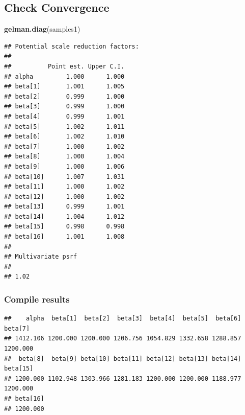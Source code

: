\documentclass[
]{article}
\newenvironment{Shaded}{\begin{snugshade}}{\end{snugshade}}
\newcommand{\FunctionTok}[1]{\textcolor[rgb]{0.13,0.29,0.53}{\textbf{#1}}}
\newcommand{\NormalTok}[1]{#1}
\newcommand{\OtherTok}[1]{\textcolor[rgb]{0.56,0.35,0.01}{#1}}
\newcommand{\SpecialCharTok}[1]{\textcolor[rgb]{0.81,0.36,0.00}{\textbf{#1}}}
\begin{document}
\subsection{Check Convergence}\label{check-convergence}

\begin{Shaded}
\begin{Highlighting}[]
\FunctionTok{gelman.diag}\NormalTok{(samples1)}
\end{Highlighting}
\end{Shaded}

\begin{verbatim}
## Potential scale reduction factors:
## 
##          Point est. Upper C.I.
## alpha         1.000      1.000
## beta[1]       1.001      1.005
## beta[2]       0.999      1.000
## beta[3]       0.999      1.000
## beta[4]       0.999      1.001
## beta[5]       1.002      1.011
## beta[6]       1.002      1.010
## beta[7]       1.000      1.002
## beta[8]       1.000      1.004
## beta[9]       1.000      1.006
## beta[10]      1.007      1.031
## beta[11]      1.000      1.002
## beta[12]      1.000      1.002
## beta[13]      0.999      1.001
## beta[14]      1.004      1.012
## beta[15]      0.998      0.998
## beta[16]      1.001      1.008
## 
## Multivariate psrf
## 
## 1.02
\end{verbatim}

\subsubsection{Compile results}\label{compile-results}

\begin{Shaded}
\end{Shaded}

\begin{verbatim}
##    alpha  beta[1]  beta[2]  beta[3]  beta[4]  beta[5]  beta[6]  beta[7] 
## 1412.106 1200.000 1200.000 1206.756 1054.829 1332.658 1288.857 1200.000 
##  beta[8]  beta[9] beta[10] beta[11] beta[12] beta[13] beta[14] beta[15] 
## 1200.000 1102.948 1303.966 1281.183 1200.000 1200.000 1188.977 1200.000 
## beta[16] 
## 1200.000
\end{verbatim}
\end{document}
